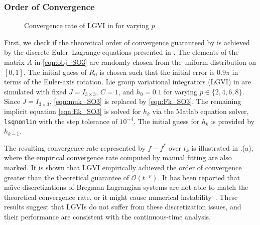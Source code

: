 \documentclass[letterpaper, 10pt, conference]{ieeeconf}
\newcommand{\bracket}[1]{\ensuremath{\left[ #1 \right]}}
\newcommand{\tr}[1]{\mbox{tr}\ensuremath{\negthickspace\bracket{#1}}}
\renewcommand{\L}{\ensuremath{\mathsf{L}}}
\renewcommand{\Re}{\ensuremath{\mathbb{R}}}
\newcommand{\D}{\ensuremath{\mathbf{D}}}
\begin{document}

\subsubsection{Order of Convergence}

\begin{figure}
    \centerline{
    }
    \centerline{
    }
    \caption{Convergence rate of LGVI in  for varying $p$}\label{fig:conv}
\end{figure}

First, we check if the theoretical order of convergence guaranteed by  is achieved by the discrete Euler--Lagrange equations presented in .
The elements of the matrix $A$ in \eqref{eqn:obj_SO3} are randomly chosen from the uniform distribution on $[0,1]$.
The initial guess of $R_0$ is chosen such that the initial error is $0.9\pi$ in terms of the Euler-axis rotation. 
Lie group variational integrators (LGVI) in  are simulated with fixed $J=I_{3\times 3}$, $C=1$, and $h_0 = 0.1$ for varying $p\in\{2,4,6,8\}$. 
Since $J=I_{3\times 3}$, \eqref{eqn:muk_SO3} is replaced by \eqref{eqn:Fk_SO3}.
The remaining implicit equation \eqref{eqn:Ek_SO3} is solved for $h_k$ via the Matlab equation solver, \texttt{lsqnonlin} with the step tolerance of $10^{-4}$.
The initial guess for $h_k$ is provided by $h_{k-1}$. 

The resulting convergence rate represented by $f-f^*$ over $t_k$ is illustrated in .(a), where the empirical convergence rate computed by manual fitting are also marked. 
It is shown that LGVI empirically achieved the order of convergence greater than the theoretical guarantee of $\mathcal{O}(t^{-p})$.
It has been reported that na\"\i ve discretizations of Bregman Lagrangian systems are not able to match the theoretical convergence rate, or it might cause numerical instability~\cite{wibisono2016variational,betancourt2018symplectic}.
These results suggest that LGVIs do not suffer from these discretization issues, and their performance are consistent with the continuous-time analysis. 
\end{document}
